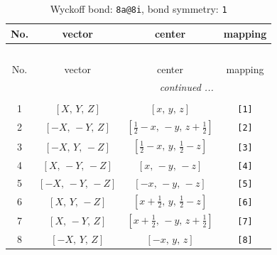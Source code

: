 \documentclass[fleqn,8pt]{jsarticle}
\begin{document}
\begin{longtable}{cccc}
\caption{Wyckoff bond: {\tt 8a@8i}, bond symmetry: {\tt 1}}
 \\
 \hline \hline
No. & vector & center & mapping \\ \hline \endfirsthead

\multicolumn{3}{l}{\tablename\ \thetable{}} \\
 \hline \hline
No. & vector & center & mapping \\ \hline \endhead

 \hline \hline
\multicolumn{3}{r}{\footnotesize\it continued ...} \\ \endfoot

 \hline \hline
\multicolumn{3}{r}{} \\ \endlastfoot

1 & $\left[ X,\, Y,\, Z \right]$ & $\left[ x,\, y,\, z \right]$ & {\tt [1]} \\ \hline
2 & $\left[ - X,\, - Y,\, Z \right]$ & $\left[ \frac{1}{2} - x,\, - y,\, z + \frac{1}{2} \right]$ & {\tt [2]} \\ \hline
3 & $\left[ - X,\, Y,\, - Z \right]$ & $\left[ \frac{1}{2} - x,\, y,\, \frac{1}{2} - z \right]$ & {\tt [3]} \\ \hline
4 & $\left[ X,\, - Y,\, - Z \right]$ & $\left[ x,\, - y,\, - z \right]$ & {\tt [4]} \\ \hline
5 & $\left[ - X,\, - Y,\, - Z \right]$ & $\left[ - x,\, - y,\, - z \right]$ & {\tt [5]} \\ \hline
6 & $\left[ X,\, Y,\, - Z \right]$ & $\left[ x + \frac{1}{2},\, y,\, \frac{1}{2} - z \right]$ & {\tt [6]} \\ \hline
7 & $\left[ X,\, - Y,\, Z \right]$ & $\left[ x + \frac{1}{2},\, - y,\, z + \frac{1}{2} \right]$ & {\tt [7]} \\ \hline
8 & $\left[ - X,\, Y,\, Z \right]$ & $\left[ - x,\, y,\, z \right]$ & {\tt [8]} \\
\end{longtable}
\end{document}
